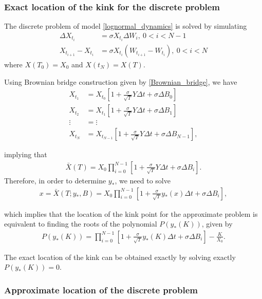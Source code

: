 \documentclass[11pt]{article}
\begin{document}
 
 \subsubsection{Exact location of the kink for the discrete problem}
 The discrete problem of model \eqref{lognormal_dynamics} is solved by simulating 
 \begin{align}\label{Discrete_problem}
 	\Delta X_{t_i}&=\sigma X_{t_i} \Delta W_{i},\: 0<i<N-1 \nonumber\\
 	X_{t_{i+1}}-X_{t_{i}}&=\sigma X_{t_i} \left(W_{t_{i+1}}-W_{t_i}\right),\: 0<i<N
 \end{align}
 where $X(T_0)=X_0$ and $X(t_N)=X(T)$. 
 
 Using Brownian bridge construction given by \eqref{Brownian_bridge}, we have
 \begin{align}
 	X_{t_1}&= X_{t_0} \left[ 1+\frac{\sigma}{\sqrt{T}} Y \Delta t+ \sigma \Delta B_0\right] \nonumber\\
 	X_{t_2}&= X_{t_1} \left[ 1+\frac{\sigma}{\sqrt{T}} Y \Delta t+ \sigma \Delta B_1\right] \nonumber\\
 	\vdots &= \vdots \nonumber\\
 	X_{t_N}&= X_{t_{N-1}} \left[ 1+\frac{\sigma}{\sqrt{T}} Y \Delta t+ \sigma \Delta B_{N-1}\right],
 \end{align}
 
 implying that
 \begin{align}
 	\bar{X}(T)=X_0 \prod_{i=0}^{N-1} \left[ 1+\frac{\sigma}{\sqrt{T}} Y \Delta t+ \sigma \Delta B_{i}\right].
 \end{align}
 Therefore, in order to determine $y_{\ast}$, we need to solve
 \begin{align}
 	x=\bar{X}(T;y_{\ast},B)=X_0 \prod_{i=0}^{N-1} \left[ 1+\frac{\sigma}{\sqrt{T}} y_{\ast}(x) \Delta t+ \sigma \Delta B_{i}\right],
 \end{align}
 
 which implies that the location of the kink point for the approximate problem is equivalent to finding the roots of the polynomial $P(y_\ast(K))$, given by
 \begin{align}\label{polynomial_kink_location}
 	P(y_{\ast}(K))=\prod_{i=0}^{N-1} \left[ 1+\frac{\sigma}{\sqrt{T}} y_\ast(K) \Delta t+ \sigma \Delta B_{i}\right]-\frac{K}{X_0}.
 \end{align}
 
 The exact location of the kink can be obtained exactly by solving exactly $P(y_{\ast}(K))=0$.
 
 \subsubsection{Approximate location of the discrete problem}
 
\end{document}
